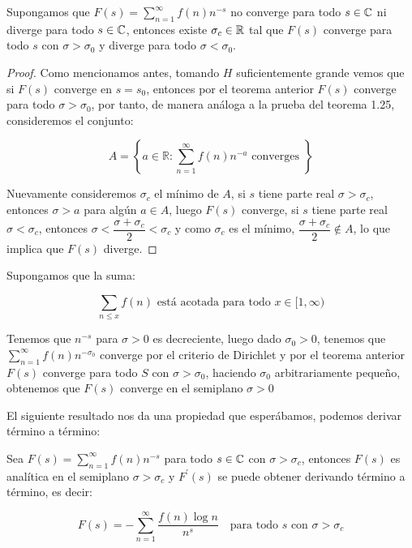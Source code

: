 \begin{theorem}
Supongamos que $F(s)=\displaystyle\sum_{n=1}^{\infty} f(n)n^{-s}$ no converge para todo $s\in \mathbb{C}$ ni diverge para todo $s\in\mathbb{C}$, entonces existe $\sigma_c\in \mathbb{R}$ tal que $F(s)$ converge para todo $s$ con $\sigma>\sigma_0$ y diverge para todo $\sigma<\sigma_0$.
\end{theorem}


\begin{proof}
Como mencionamos antes, tomando $H$ suficientemente grande vemos que si $F(s)$ converge en $s=s_0$, entonces por el teorema anterior $F(s)$ converge para todo $\sigma>\sigma_0$, por tanto, de manera análoga a la prueba del teorema 1.25, consideremos el conjunto:

$$A=\left\{a \in \mathbb{R} : \sum_{n=1}^{\infty} f(n) n^{-a} \text { converges }\right\}$$

Nuevamente  consideremos $\sigma_c$ el mínimo de $A$, si $s$ tiene parte real $\sigma>\sigma_c$, entonces $\sigma>a$ para algún $a\in A$, luego $F(s)$ converge, si $s$ tiene parte real $\sigma<\sigma_c$, entonces $\sigma<\dfrac{\sigma+\sigma_c}{2}<\sigma_c$ y como $\sigma_c$ es el mínimo, $\dfrac{\sigma+\sigma_c}{2}\not\in A$, lo que implica que $F(s)$ diverge.
\end{proof}

\begin{eg}
Supongamos que la suma:

$$\sum_{n\leq x}f(n) \text{ está acotada para  todo }x\in [1,\infty)$$

Tenemos que $n^{-s}$ para $\sigma>0$ es decreciente, luego dado $\sigma_0>0$, tenemos que $\displaystyle\sum_{n=1}^{\infty}f(n)n^{-\sigma_0}$ converge por el criterio de Dirichlet y por el teorema anterior $F(s)$ converge para todo $S$ con $\sigma>\sigma_0$, haciendo $\sigma_0$ arbitrariamente pequeño, obtenemos que $F(s)$  converge en el semiplano $\sigma>0$
\end{eg}

El siguiente resultado nos da una propiedad que esperábamos, podemos derivar término a término:

\begin{corollary}
Sea $F(s)=\sum_{n=1}^{\infty} f(n)n^{-s}$ para todo $s\in \mathbb{C}$ con $\sigma>\sigma_c$, entonces $F(s)$ es analítica en el semiplano $\sigma>\sigma_c$ y $F^{\prime}(s)$ se puede obtener derivando término a término, es decir:

$$F(s)=-\sum_{n=1}^{\infty}\frac{f(n)\log n}{n^s} \quad \text{para todo } s \text{ con } \sigma>\sigma_c$$
\end{corollary}


